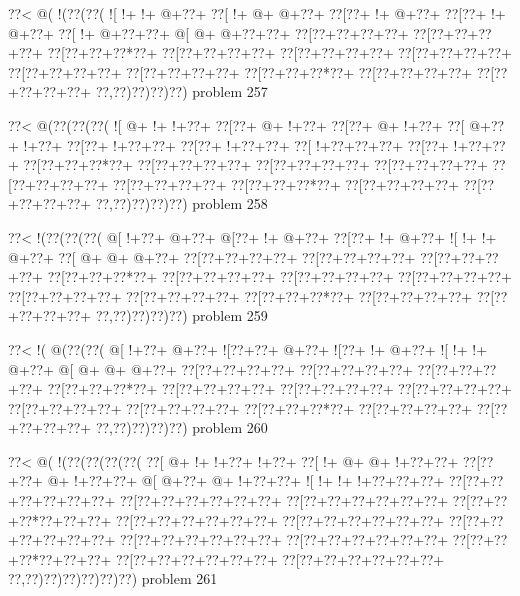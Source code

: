 \vbox{\vbox{\goo
\0??<\- @(\- !(\0??(\0??(
\- ![\- !+\- !+\- @+\0??+
\0??[\- !+\- @+\- @+\0??+
\0??[\0??+\- !+\- @+\0??+
\0??[\0??+\- !+\- @+\0??+
\0??[\- !+\- @+\0??+\0??+
\- @[\- @+\- @+\0??+\0??+
\0??[\0??+\0??+\0??+\0??+
\0??[\0??+\0??+\0??+\0??+
\0??[\0??+\0??+\0??*\0??+
\0??[\0??+\0??+\0??+\0??+
\0??[\0??+\0??+\0??+\0??+
\0??[\0??+\0??+\0??+\0??+
\0??[\0??+\0??+\0??+\0??+
\0??[\0??+\0??+\0??+\0??+
\0??[\0??+\0??+\0??*\0??+
\0??[\0??+\0??+\0??+\0??+
\0??[\0??+\0??+\0??+\0??+
\0??,\0??)\0??)\0??)\0??)
}
\hfil problem 257\hfil\break
}

\vbox{\vbox{\goo
\0??<\- @(\0??(\0??(\0??(
\- ![\- @+\- !+\- !+\0??+
\0??[\0??+\- @+\- !+\0??+
\0??[\0??+\- @+\- !+\0??+
\0??[\- @+\0??+\- !+\0??+
\0??[\0??+\- !+\0??+\0??+
\0??[\0??+\- !+\0??+\0??+
\0??[\- !+\0??+\0??+\0??+
\0??[\0??+\- !+\0??+\0??+
\0??[\0??+\0??+\0??*\0??+
\0??[\0??+\0??+\0??+\0??+
\0??[\0??+\0??+\0??+\0??+
\0??[\0??+\0??+\0??+\0??+
\0??[\0??+\0??+\0??+\0??+
\0??[\0??+\0??+\0??+\0??+
\0??[\0??+\0??+\0??*\0??+
\0??[\0??+\0??+\0??+\0??+
\0??[\0??+\0??+\0??+\0??+
\0??,\0??)\0??)\0??)\0??)
}
\hfil problem 258\hfil\break
}

\vbox{\vbox{\goo
\0??<\- !(\0??(\0??(\0??(
\- @[\- !+\0??+\- @+\0??+
\- @[\0??+\- !+\- @+\0??+
\0??[\0??+\- !+\- @+\0??+
\- ![\- !+\- !+\- @+\0??+
\0??[\- @+\- @+\- @+\0??+
\0??[\0??+\0??+\0??+\0??+
\0??[\0??+\0??+\0??+\0??+
\0??[\0??+\0??+\0??+\0??+
\0??[\0??+\0??+\0??*\0??+
\0??[\0??+\0??+\0??+\0??+
\0??[\0??+\0??+\0??+\0??+
\0??[\0??+\0??+\0??+\0??+
\0??[\0??+\0??+\0??+\0??+
\0??[\0??+\0??+\0??+\0??+
\0??[\0??+\0??+\0??*\0??+
\0??[\0??+\0??+\0??+\0??+
\0??[\0??+\0??+\0??+\0??+
\0??,\0??)\0??)\0??)\0??)
}
\hfil problem 259\hfil\break
}

\vbox{\vbox{\goo
\0??<\- !(\- @(\0??(\0??(
\- @[\- !+\0??+\- @+\0??+
\- ![\0??+\0??+\- @+\0??+
\- ![\0??+\- !+\- @+\0??+
\- ![\- !+\- !+\- @+\0??+
\- @[\- @+\- @+\- @+\0??+
\0??[\0??+\0??+\0??+\0??+
\0??[\0??+\0??+\0??+\0??+
\0??[\0??+\0??+\0??+\0??+
\0??[\0??+\0??+\0??*\0??+
\0??[\0??+\0??+\0??+\0??+
\0??[\0??+\0??+\0??+\0??+
\0??[\0??+\0??+\0??+\0??+
\0??[\0??+\0??+\0??+\0??+
\0??[\0??+\0??+\0??+\0??+
\0??[\0??+\0??+\0??*\0??+
\0??[\0??+\0??+\0??+\0??+
\0??[\0??+\0??+\0??+\0??+
\0??,\0??)\0??)\0??)\0??)
}
\hfil problem 260\hfil\break
}

\vbox{\vbox{\goo
\0??<\- @(\- !(\0??(\0??(\0??(\0??(
\0??[\- @+\- !+\- !+\0??+\- !+\0??+
\0??[\- !+\- @+\- @+\- !+\0??+\0??+
\0??[\0??+\0??+\- @+\- !+\0??+\0??+
\- @[\- @+\0??+\- @+\- !+\0??+\0??+
\- ![\- !+\- !+\- !+\0??+\0??+\0??+
\0??[\0??+\0??+\0??+\0??+\0??+\0??+
\0??[\0??+\0??+\0??+\0??+\0??+\0??+
\0??[\0??+\0??+\0??+\0??+\0??+\0??+
\0??[\0??+\0??+\0??*\0??+\0??+\0??+
\0??[\0??+\0??+\0??+\0??+\0??+\0??+
\0??[\0??+\0??+\0??+\0??+\0??+\0??+
\0??[\0??+\0??+\0??+\0??+\0??+\0??+
\0??[\0??+\0??+\0??+\0??+\0??+\0??+
\0??[\0??+\0??+\0??+\0??+\0??+\0??+
\0??[\0??+\0??+\0??*\0??+\0??+\0??+
\0??[\0??+\0??+\0??+\0??+\0??+\0??+
\0??[\0??+\0??+\0??+\0??+\0??+\0??+
\0??,\0??)\0??)\0??)\0??)\0??)\0??)
}
\hfil problem 261\hfil\break
}

